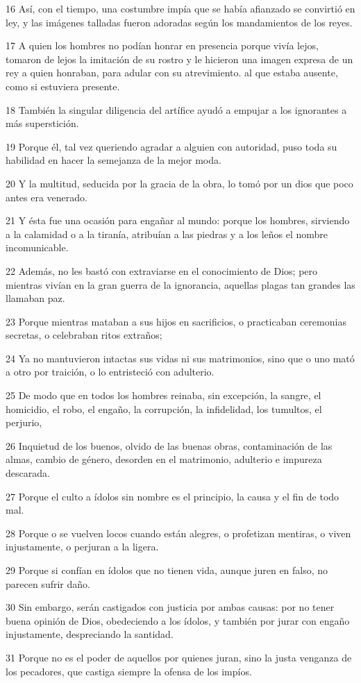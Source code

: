 \par 16 Así, con el tiempo, una costumbre impía que se había afianzado se convirtió en ley, y las imágenes talladas fueron adoradas según los mandamientos de los reyes.
\par 17 A quien los hombres no podían honrar en presencia porque vivía lejos, tomaron de lejos la imitación de su rostro y le hicieron una imagen expresa de un rey a quien honraban, para adular con su atrevimiento. al que estaba ausente, como si estuviera presente.
\par 18 También la singular diligencia del artífice ayudó a empujar a los ignorantes a más superstición.
\par 19 Porque él, tal vez queriendo agradar a alguien con autoridad, puso toda su habilidad en hacer la semejanza de la mejor moda.
\par 20 Y la multitud, seducida por la gracia de la obra, lo tomó por un dios que poco antes era venerado.
\par 21 Y ésta fue una ocasión para engañar al mundo: porque los hombres, sirviendo a la calamidad o a la tiranía, atribuían a las piedras y a los leños el nombre incomunicable.
\par 22 Además, no les bastó con extraviarse en el conocimiento de Dios; pero mientras vivían en la gran guerra de la ignorancia, aquellas plagas tan grandes las llamaban paz.
\par 23 Porque mientras mataban a sus hijos en sacrificios, o practicaban ceremonias secretas, o celebraban ritos extraños;
\par 24 Ya no mantuvieron intactas sus vidas ni sus matrimonios, sino que o uno mató a otro por traición, o lo entristeció con adulterio.
\par 25 De modo que en todos los hombres reinaba, sin excepción, la sangre, el homicidio, el robo, el engaño, la corrupción, la infidelidad, los tumultos, el perjurio,
\par 26 Inquietud de los buenos, olvido de las buenas obras, contaminación de las almas, cambio de género, desorden en el matrimonio, adulterio e impureza descarada.
\par 27 Porque el culto a ídolos sin nombre es el principio, la causa y el fin de todo mal.
\par 28 Porque o se vuelven locos cuando están alegres, o profetizan mentiras, o viven injustamente, o perjuran a la ligera.
\par 29 Porque si confían en ídolos que no tienen vida, aunque juren en falso, no parecen sufrir daño.
\par 30 Sin embargo, serán castigados con justicia por ambas causas: por no tener buena opinión de Dios, obedeciendo a los ídolos, y también por jurar con engaño injustamente, despreciando la santidad.
\par 31 Porque no es el poder de aquellos por quienes juran, sino la justa venganza de los pecadores, que castiga siempre la ofensa de los impíos.

